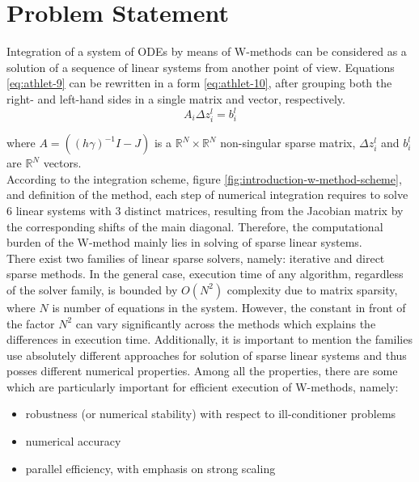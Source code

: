 \chapter{Problem Statement}\label{chapter:problem-statment}


Integration of a system of ODEs by means of W-methods can be considered as a solution of a sequence of linear systems from another point of view. Equations \ref{eq:athlet-9} can be rewritten in a form \ref{eq:athlet-10}, after grouping both the right- and left-hand sides in a single matrix and vector, respectively.\\


\begin{equation} \label{eq:athlet-10}
	A_{i} \Delta z^{l}_{i} =  b^{l}_{i} 
\end{equation}

where $A = ((h \gamma)^{-1}I - J)$ is a $\mathbb{R}^{N} \times \mathbb{R}^{N}$ non-singular sparse matrix, $\Delta z^{l}_{i}$  and $b^{l}_{i}$ are $\mathbb{R}^{N}$ vectors.\\


According to the integration scheme, figure \ref{fig:introduction-w-method-scheme}, and definition of the method, each step of numerical integration requires to solve 6 linear systems with 3 distinct matrices, resulting from the Jacobian matrix by the corresponding shifts of the main diagonal. Therefore, the computational burden of the W-method mainly lies in solving of sparse linear systems.\\


There exist two families of linear sparse solvers, namely: iterative and direct sparse methods. In the general case, execution time of any algorithm, regardless of the solver family, is bounded by $O(N^2)$ complexity due to matrix sparsity, where $N$ is number of equations in the system. However, the constant in front of the factor $N^2$ can vary significantly across the methods which explains the differences in execution time. Additionally, it is important to mention the families use absolutely different approaches for solution of sparse linear systems and thus posses different numerical properties. Among all the properties, there are some which are particularly important for efficient execution of W-methods, namely: \\


\begin{itemize}
	\item robustness (or numerical stability) with respect to ill-conditioner problems
	\item numerical accuracy
	\item parallel efficiency, with emphasis on strong scaling 
\end{itemize}



